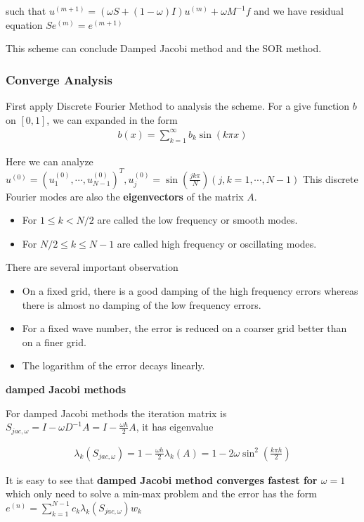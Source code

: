 \documentclass[12pt]{amsart}
\begin{document}
such that $u^{(m+1)}=(\omega S+(1-\omega)I)u^{(m)}+\omega M^{-1}f$ and we have residual equation $Se^{(m)}=e^{(m+1)}$

This scheme can conclude Damped Jacobi method and the SOR method.
\subsubsection{Converge Analysis}
First apply Discrete Fourier Method to analysis the scheme. For a give function $b$ on $[0,1]$, we can expanded in the form
\begin{align*}
b(x)=\sum_{k=1}^{\infty} b_k\sin(k\pi x)
\end{align*}

Here we can analyze $u^{(0)}=(u_1^{(0)},\cdots,u_{N-1}^{(0)})^T,u_j^{(0)}=\sin(\frac{jk\pi}{N})(j,k=1,\cdots,N-1)$  This discrete Fourier modes are also the \textbf{eigenvectors} of the matrix $A$. 
\begin{itemize}
	\item For $1\le k <N/2$ are called the low frequency or smooth modes.
	\item For $N/2\le k\le N-1$ are called high frequency or oscillating modes.
\end{itemize}

There are several important observation
\begin{itemize}
	\item On a fixed grid, there is a good damping of the high frequency errors whereas there is almost no damping of the low frequency errors.
	\item For a fixed wave number, the error is reduced on a coarser grid better than on a finer grid.
	\item The logarithm of the error decays linearly.
\end{itemize}

\textbf{damped Jacobi methods}

For damped Jacobi methods the iteration matrix is $S_{jac,\omega}=I-\omega D^{-1}A=I-\frac{\omega h}{2}A$, it has eigenvalue

\begin{align*}
\lambda_k(S_{jac,\omega})=1-\frac{\omega h}{2}\lambda_k(A)=1-2\omega\sin^2(\frac{k\pi h}{2})
\end{align*}

It is easy to see that \textbf{damped Jacobi method converges fastest for $\omega=1$} which only need to solve a  min-max problem and the error has the form $e^{(n)}=\sum_{k=1}^{N-1} c_k\lambda_k(S_{jac,\omega})w_k$
\end{document}
